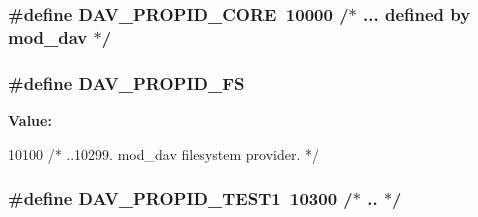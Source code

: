 \subsubsection[{\texorpdfstring{D\+A\+V\+\_\+\+P\+R\+O\+P\+I\+D\+\_\+\+C\+O\+RE}{DAV_PROPID_CORE}}]{\setlength{\rightskip}{0pt plus 5cm}\#define D\+A\+V\+\_\+\+P\+R\+O\+P\+I\+D\+\_\+\+C\+O\+RE~10000   /$\ast$ ... {\bf defined} by mod\+\_\+dav $\ast$/}\hypertarget{group__MOD__DAV_gac4c19935b3c101a1aaae9d3bdbf85720}{}\label{group__MOD__DAV_gac4c19935b3c101a1aaae9d3bdbf85720}
\subsubsection[{\texorpdfstring{D\+A\+V\+\_\+\+P\+R\+O\+P\+I\+D\+\_\+\+FS}{DAV_PROPID_FS}}]{\setlength{\rightskip}{0pt plus 5cm}\#define D\+A\+V\+\_\+\+P\+R\+O\+P\+I\+D\+\_\+\+FS}\hypertarget{group__MOD__DAV_gaf920a023f022af338bca841d5a8ef418}{}\label{group__MOD__DAV_gaf920a023f022af338bca841d5a8ef418}
{\bfseries Value\+:}
\begin{DoxyCode}
10100   \textcolor{comment}{/* ..10299.}
\textcolor{comment}{                                           mod\_dav filesystem provider. */}
\end{DoxyCode}
\subsubsection[{\texorpdfstring{D\+A\+V\+\_\+\+P\+R\+O\+P\+I\+D\+\_\+\+T\+E\+S\+T1}{DAV_PROPID_TEST1}}]{\setlength{\rightskip}{0pt plus 5cm}\#define D\+A\+V\+\_\+\+P\+R\+O\+P\+I\+D\+\_\+\+T\+E\+S\+T1~10300   /$\ast$ .. $\ast$/}\hypertarget{group__MOD__DAV_ga7f09ddc35d2ff64baf54e4e7a8eee9db}{}\label{group__MOD__DAV_ga7f09ddc35d2ff64baf54e4e7a8eee9db}
